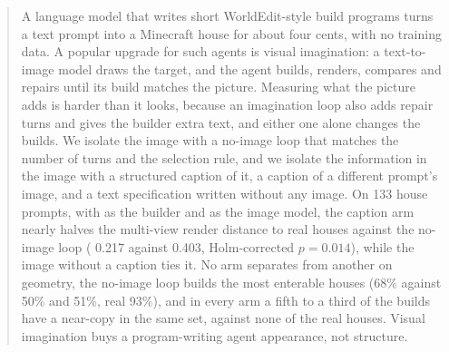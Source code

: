 \begin{abstract}
A language model that writes short WorldEdit-style build programs turns a text prompt into a
Minecraft house for about four cents, with no training data. A popular upgrade for such agents
is visual imagination: a text-to-image model draws the target, and the agent builds, renders,
compares and repairs until its build matches the picture. Measuring what the picture adds is
harder than it looks, because an imagination loop also adds repair turns and gives the builder
extra text, and either one alone changes the builds. We isolate the image with a no-image loop
that matches the number of turns and the selection rule, and we isolate the information in the
image with a structured caption of it, a caption of a different prompt's image, and a text
specification written without any image. On 133 house prompts, with \gptmini{} as the builder and
\imgmini{} as the image model, the caption arm nearly halves the multi-view render distance to real
houses against the no-image loop (\mvkid{} 0.217 against 0.403, Holm-corrected $p=0.014$), while
the image without a caption ties it. No arm separates from another on geometry, the
no-image loop builds the most enterable houses (68\% against 50\% and 51\%, real 93\%), and in every
arm a fifth to a third of the builds have a near-copy in the same set, against none of the real houses. Visual imagination
buys a program-writing agent appearance, not structure. 
\end{abstract}
